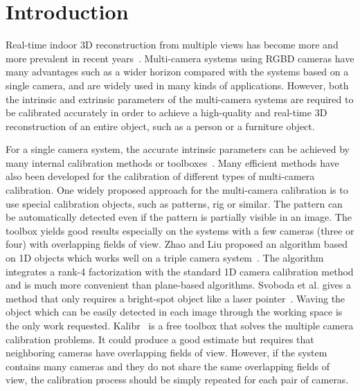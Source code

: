 
\section{Introduction}

Real-time indoor 3D reconstruction from multiple views has become more and more prevalent in recent years~\cite{dou2016fusion4d,orts2016holoportation}. Multi-camera systems using RGBD cameras have many advantages such as a wider horizon compared with the systems based on a single camera, and are widely used in many kinds of applications. However, both the intrinsic and extrinsic parameters of the multi-camera systems are required to be calibrated accurately in order to achieve a high-quality and real-time 3D reconstruction of an entire object, such as a person or a furniture object.

For a single camera system, the accurate intrinsic parameters can be achieved by many internal calibration methods or toolboxes~\cite{zhang2000flexible,zhang2004camera}. Many efficient methods have also been developed for the calibration of different types of multi-camera calibration.
%
One widely proposed approach for the multi-camera calibration is to use special calibration objects, such as patterns, rig or similar.
%
The pattern can be automatically detected even if the pattern is partially visible in an image. The toolbox yields good results especially on the systems with a few cameras (three or four) with  overlapping fields of view.
%
Zhao and Liu proposed an algorithm based on 1D objects  which works well on a triple camera system~\cite{zhao2008practical}.  The algorithm integrates a rank-4 factorization with the standard 1D camera calibration method and is much more convenient than plane-based algorithms.
Svoboda et al. gives a method that only requires a bright-spot object like a laser pointer~\cite{svoboda2005convenient}. Waving the object which can be easily detected in each image through the working space is the only work requested.
Kalibr~\cite{Maye2013Self} is a free toolbox that solves the multiple camera calibration problems.
%
It could produce a good estimate but requires that neighboring cameras have overlapping fields of view.
However, if the system contains many cameras and they do not share the same overlapping fields of view, the calibration process should be simply repeated for each pair of cameras. 

